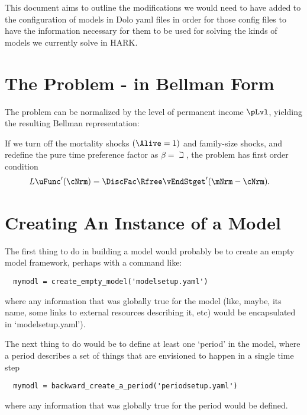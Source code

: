 \documentclass[SolvingMicroDSOPs]{subfiles}
\begin{document}

This document aims to outline the modifications we would need to have added to the configuration of models in Dolo yaml files in order for those config files to have the information necessary for them to be used for solving the kinds of models we currently solve in HARK.

\section{The Problem - in Bellman Form}





The problem can be normalized by the level of permanent income $\pLvl$, yielding the resulting Bellman representation:






If we turn off the mortality shocks $(\Alive=1)$ and family-size shocks, and redefine the pure time preference factor as $\beta=\beth$, the problem has first order condition
\begin{align}
L   \uFunc^{\prime}(\cNrm) & = \DiscFac \Rfree \vEndStget^{\prime}(\mNrm - \cNrm).  \label{eq:FOCstep}
\end{align}

\section{Creating An Instance of a Model}

The first thing to do in building a model would probably be to create an empty model framework, perhaps with a command like:

\begin{verbatim}
  mymodl = create_empty_model('modelsetup.yaml')
\end{verbatim}
where any information that was globally true for the model (like, maybe, its name, some links to external resources describing it, etc) would be encapsulated in `modelsetup.yaml').

The next thing to do would be to define at least one `period' in the model, where a period describes a set of things that are envisioned to happen in a single time step
\begin{verbatim}
  mymodl = backward_create_a_period('periodsetup.yaml')
\end{verbatim}
where any information that was globally true for the period would be defined.
\end{document}
